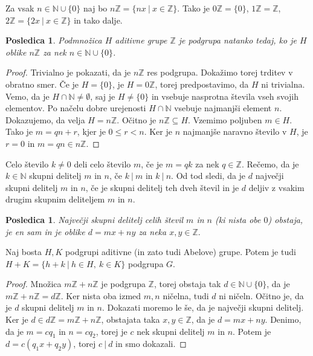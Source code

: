 \documentclass[10pt, a4paper]{article}
\newtheorem{posledica}[izr]{Posledica}
\newenvironment{noticeC}{%
  \tcolorbox[%
  notitle,
  empty,
  enhanced,  %
  breakable,
  coltext=black, 
  fontupper=\rmfamily,
  noparskip,
  sharp corners,
  boxrule=-1pt,  %
  frame hidden,
  left=7pt,  %
  right=7pt,
  top=5pt,
  bottom=5pt,
  before skip=2.5ex plus 2pt,
  after skip=2.5ex plus 2pt,
  overlay unbroken and last={%
  },
  ]}
{\endtcolorbox}
\newenvironment{dokaz}%
  {\begin{noticeC}\begin{proof}}%
  {\end{proof}\end{noticeC}}
\newcommand{\N}{\mathbb {N}}
\newcommand{\Z}{\mathbb {Z}}
\begin{document}
Za vsak $n \in \N \cup \{0\}$ naj bo $n \Z = \{nx\ |\ x \in \Z\}$.
Tako je $0\Z = \{0\}$, $1 \Z = \Z$, $2 \Z = \{2x\ |\ x \in \Z\}$ in tako dalje.

\begin{posledica}
  Podmnožica $H$ aditivne grupe $\Z$ je podgrupa natanko tedaj, ko je $H$ oblike $n \Z$ za nek $n \in \N \cup \{0\}$.
\end{posledica}

\begin{dokaz}
  Trivialno je pokazati, da je $n \Z$ res podgrupa.
  Dokažimo torej trditev v obratno smer.
  Če je $H = \{0\}$, je $H = 0\Z$, torej predpostavimo, da $H$ ni trivialna.
  Vemo, da je $H \cap \N \neq \emptyset$, saj je $H \neq \{0\}$ in vsebuje nasprotna števila vseh svojih elementov.
  Po načelu dobre urejenosti $H \cap \N$ vsebuje najmanjši element $n$.
  Dokazujemo, da velja $H = n \Z$. Očitno je $n \Z \subseteq H$.
  Vzemimo poljuben $m \in H$.
  Tako je $m = qn + r$, kjer je $0 \leq r < n$.
  Ker je $n$ najmanjše naravno število v $H$, je $r = 0$ in $m = qn \in n\Z$. 
\end{dokaz}

Celo število $k \neq 0$ deli celo število $m$, če je $m = qk$ za nek $q \in \Z.$
Rečemo, da je $k \in \N$ skupni delitelj $m$ in $n$, če $k\ |\ m$ in $k\ |\ n$.
Od tod sledi, da je $d$ največji skupni delitelj $m$ in $n$, 
če je skupni delitelj teh dveh števil in je $d$ deljiv z vsakim drugim skupnim deliteljem $m$ in $n$.

\begin{posledica}
  Največji skupni delitelj celih števil $m$ in $n$ (ki nista obe $0$) obstaja, je en sam 
  in je oblike $d = mx + n y$ za neka $x, y \in \Z.$
\end{posledica}

Naj bosta $H, K$ podgrupi aditivne (in zato tudi Abelove) grupe.
Potem je tudi $H + K = \{h + k\ |\ h \in H,\ k \in K\}$ podgrupa $G$.

\begin{dokaz}
  Množica $m\Z + n\Z$ je podgrupa $\Z$, torej obstaja tak $d \in \N \cup \{0\}$, da je $m\Z + n\Z = d\Z$.
  Ker nista oba izmed $m, n$ ničelna, tudi $d$ ni ničeln.
  Očitno je, da je $d$ skupni delitelj $m$ in $n$. Dokazati moremo le še, da je največji skupni delitelj.
  Ker je $d \in d\Z = m \Z + n \Z$, obstajata taka $x, y \in \Z$, da je $d = mx + ny$.
  Denimo, da je $m = c q_1$ in $n = c q_2$, torej je $c$ nek skupni delitelj $m$ in $n$.
  Potem je $d = c(q_1 x + q_2 y)$, torej $c\ |\ d$ in smo dokazali.
\end{dokaz}
\end{document}
